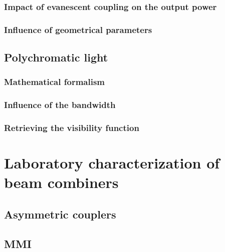 \documentclass[a4paper,twoside,11pt]{article}
\begin{document}
        \subsubsection{Impact of evanescent coupling on the output power}
        
        
        \subsubsection{Influence of geometrical parameters}
        
        
    
    \subsection{Polychromatic light}
    
        \subsubsection{Mathematical formalism}
        
        
        \subsubsection{Influence of the bandwidth}
        
        
        \subsubsection{Retrieving the visibility function}
        

\section{Laboratory characterization of beam combiners}

    \subsection{Asymmetric couplers}
    
    \subsection{MMI}
    
\end{document}
